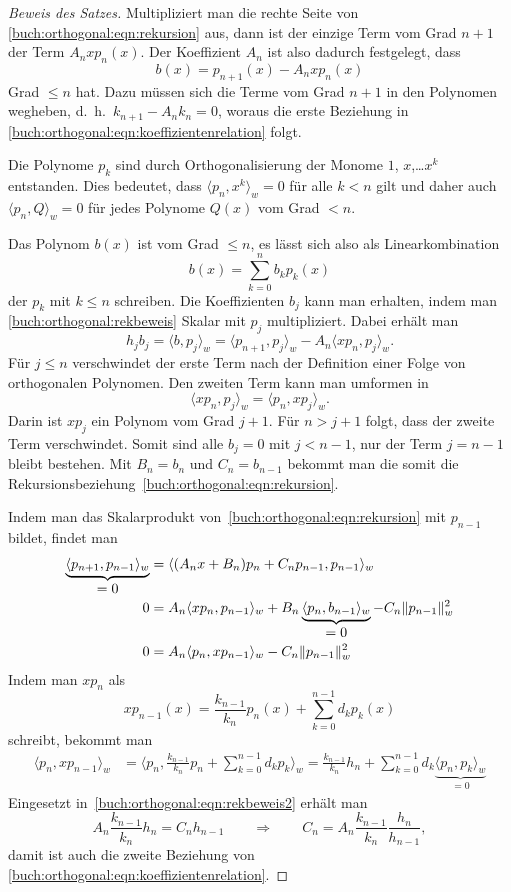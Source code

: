 \begin{proof}[Beweis des Satzes]
Multipliziert man die rechte Seite von
\eqref{buch:orthogonal:eqn:rekursion} aus, dann ist der einzige Term
vom Grad $n+1$ der Term $A_nxp_n(x)$.
Der Koeffizient $A_n$ ist also dadurch festgelegt, dass
\begin{equation}
b(x)
=
p_{n+1}(x) - A_nxp_n(x)
\label{buch:orthogonal:rekbeweis}
\end{equation}
Grad $\le n$ hat.
Dazu müssen sich die Terme vom Grad $n+1$ in den Polynomen wegheben,
d.~h.~$k_{n+1}-A_nk_n=0$, woraus die erste Beziehung in
\eqref{buch:orthogonal:eqn:koeffizientenrelation} folgt.

Die Polynome $p_k$ sind durch Orthogonalisierung der Monome
$1$, $x$,\dots $x^{k}$ entstanden.
Dies bedeutet, dass $\langle p_n,x^k\rangle_w=0$ für alle $k<n$
gilt und daher auch $\langle p_n,Q\rangle_w=0$ für jedes Polynome
$Q(x)$ vom Grad $<n$.

Das Polynom $b(x)$ ist vom Grad $\le n$, es lässt sich also als
Linearkombination
\[
b(x) = \sum_{k=0}^n b_k p_k(x)
\]
der $p_k$ mit $k\le n$ schreiben.
Die Koeffizienten $b_j$ kann man erhalten, indem man 
\eqref{buch:orthogonal:rekbeweis} Skalar mit $p_j$ multipliziert.
Dabei erhält man
\[
h_jb_j
=
\langle b,p_j\rangle_w
=
\langle p_{n+1},p_j\rangle_w
-
A_n\langle xp_n,p_j\rangle_w.
\]
Für $j\le n$ verschwindet der erste Term nach der Definition einer
Folge von orthogonalen Polynomen.
Den zweiten Term kann man umformen in
\[
\langle xp_n,p_j\rangle_w
=
\langle p_n,xp_j\rangle_w.
\]
Darin ist $xp_j$ ein Polynom vom Grad $j+1$.
Für $n>j+1$ folgt, dass der zweite Term verschwindet.
Somit sind alle $b_j=0$ mit $j<n-1$, nur der Term $j=n-1$
bleibt bestehen.
Mit $B_n=b_n$ und $C_n=b_{n-1}$ bekommt man die somit die
Rekursionsbeziehung~\eqref{buch:orthogonal:eqn:rekursion}.

Indem man das Skalarprodukt von~\eqref{buch:orthogonal:eqn:rekursion}
mit $p_{n-1}$ bildet, findet man
\begin{align}
\underbrace{\langle
p_{n+1},p_{n-1}
\rangle_w}_{\displaystyle=0}
&=
\langle (A_nx+B_n)p_n+C_np_{n-1},p_{n-1} \rangle_w
\notag
\\
0
&=
A_n\langle xp_n,p_{n-1} \rangle_w
+B_n\underbrace{\langle p_n,b_{n-1}\rangle_w}_{\displaystyle=0}
-C_n\|p_{n-1}\|_w^2
\notag
\\
0
&=
A_n\langle p_n,xp_{n-1} \rangle_w
-C_n\|p_{n-1}\|_w^2
\label{buch:orthogonal:eqn:rekbeweis2}
\end{align}
Indem man $xp_n$ als
\[
xp_{n-1}(x)
=
\frac{k_{n-1}}{k_n} p_n(x)
+
\sum_{k=0}^{n-1} d_kp_k(x)
\]
schreibt, bekommt man
\begin{align*}
\langle
p_n,
xp_{n-1}
\rangle_w
&=
\biggl\langle
p_n,
\frac{k_{n-1}}{k_n} p_n
+
\sum_{k=0}^{n-1} d_kp_k
\biggr\rangle_w
=
\frac{k_{n-1}}{k_n}h_n
+
\sum_{k=0}^{n-1} d_k\underbrace{\langle p_n,p_k\rangle_w}_{\displaystyle=0}
\end{align*}
Eingesetzt in~\eqref{buch:orthogonal:eqn:rekbeweis2} erhält man
\[
A_n\frac{k_{n-1}}{k_n}h_n = C_n h_{n-1}
\qquad\Rightarrow\qquad
C_n
=
A_n\frac{k_{n-1}}{k_n}\frac{h_n}{h_{n-1}},
\]
damit ist auch die zweite Beziehung von
\eqref{buch:orthogonal:eqn:koeffizientenrelation}.
\end{proof}
